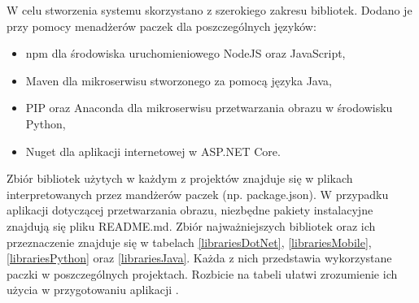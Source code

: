 W celu stworzenia systemu skorzystano z szerokiego zakresu bibliotek. Dodano je przy pomocy menadżerów paczek dla poszczególnych języków:
\begin{itemize}[noitemsep]
	\item npm dla środowiska uruchomieniowego NodeJS oraz JavaScript,
	\item Maven dla mikroserwisu stworzonego za pomocą języka Java,
	\item PIP oraz Anaconda dla mikroserwisu przetwarzania obrazu w środowisku Python,
	\item Nuget dla aplikacji internetowej w ASP.NET Core.
\end{itemize}

Zbiór bibliotek użytych w każdym z projektów znajduje się w plikach interpretowanych przez mandżerów paczek (np. package.json). W przypadku aplikacji dotyczącej przetwarzania obrazu, niezbędne pakiety instalacyjne znajdują się pliku README.md. Zbiór najważniejszych bibliotek oraz ich przeznaczenie znajduje się w tabelach \ref{librariesDotNet}, \ref{librariesMobile}, \ref{librariesPython} oraz \ref{librariesJava}. Każda z nich przedstawia wykorzystane paczki w poszczególnych projektach. Rozbicie na tabeli ułatwi zrozumienie ich użycia w przygotowaniu aplikacji .

